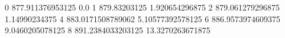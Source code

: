 0 877.911376953125 0.0
1 879.83203125 1.920654296875
2 879.061279296875 1.14990234375
4 883.0171508789062 5.10577392578125
6 886.9573974609375 9.0460205078125
8 891.2384033203125 13.3270263671875
